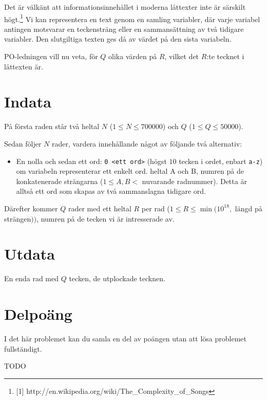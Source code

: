 
Det är välkänt att informationsinnehållet i moderna låttexter inte är särskilt
högt.\footnote{[1] http://en.wikipedia.org/wiki/The\_Complexity\_of\_Songs}
Vi kan representera en text genom en samling variabler, där varje
variabel antingen motsvarar en teckensträng eller en sammansättning av två
tidigare variabler. Den slutgiltiga texten ges då av värdet på den sista
variabeln.

PO-ledningen vill nu veta, för $Q$ olika värden på $R$, vilket det $R$:te tecknet i
låttexten är.

\section*{Indata}

På första raden står två heltal $N$ ($1 \leq N \leq 700000$) och $Q$ ($1 \leq Q
\leq 50000$).

Sedan följer $N$ rader, vardera innehållande något av följande två alternativ:

\begin{itemize}
\item En nolla och sedan ett ord: \texttt{0 <ett ord>} (högst $10$ tecken i
      ordet, enbart \texttt{a-z}) om variabeln representerar ett enkelt ord.
 heltal A och B, numren på de konkatenerade strängarna
      ($1 \leq A, B < $ nuvarande radnummer). Detta är alltså ett ord som skapas
      av två sammanslagna tidigare ord.
\end{itemize}

Därefter kommer $Q$ rader med ett heltal $R$ per rad ($1 \leq R \leq \min(10^{18},$ längd på
strängen$))$, numren på de tecken vi är intresserade av.

\section*{Utdata}

En enda rad med $Q$ tecken, de utplockade tecknen.

\section*{Delpoäng}

I det här problemet kan du samla en del av poängen utan att
lösa problemet fullständigt.

TODO
